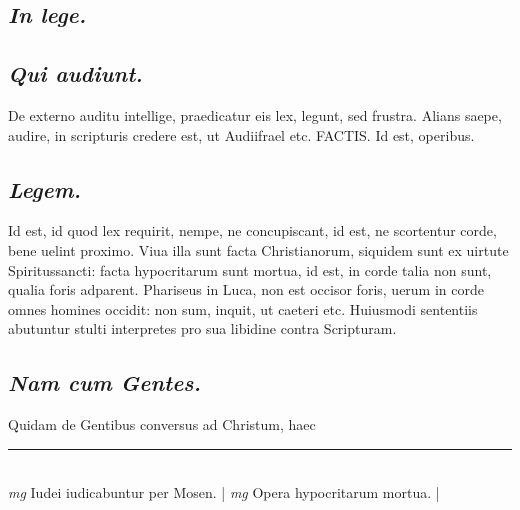\documentclass{article}
\begin{document}
\begin{pages}
\subsection*{\textit{In lege. }}
{}
\subsection*{\textit{Qui audiunt. }}\pstart De externo auditu intellige, praedicatur eis lex, legunt, sed frustra. Alians saepe, audire, in scripturis credere est, ut Audiifrael etc. FACTIS.  Id est, operibus.   \pend
{}
{}
\subsection*{\textit{Legem. }}\pstart Id est, id quod lex requirit, nempe, ne concupiscant, id est, ne scortentur corde, bene uelint proximo. Viua illa sunt facta Christianorum, siquidem sunt ex uirtute Spiritussancti: facta hypocritarum sunt mortua, id est, in corde talia non sunt, qualia foris adparent.  Phariseus in Luca, non est occisor foris, uerum in corde omnes homines occidit: non sum, inquit, ut caeteri etc. Huiusmodi sententiis abutuntur stulti interpretes pro sua libidine contra Scripturam.   \pend
{}
{}
\subsection*{\textit{Nam cum Gentes. }}\pstart Quidam de Gentibus conversus ad Christum, haec  \pend
\vspace{0.5cm}\noindent
\vspace{0.2cm}\rule{1cm}{0.2pt}\\ 
\hspace{0.2cm}\textit{mg}
\footnotesize Iudei iudicabuntur per Mosen.  
\normalsize| 
\hspace{0.2cm}\textit{mg}
\footnotesize Opera hypocritarum mortua.  
\normalsize| 

\end{pages}
\end{document}
